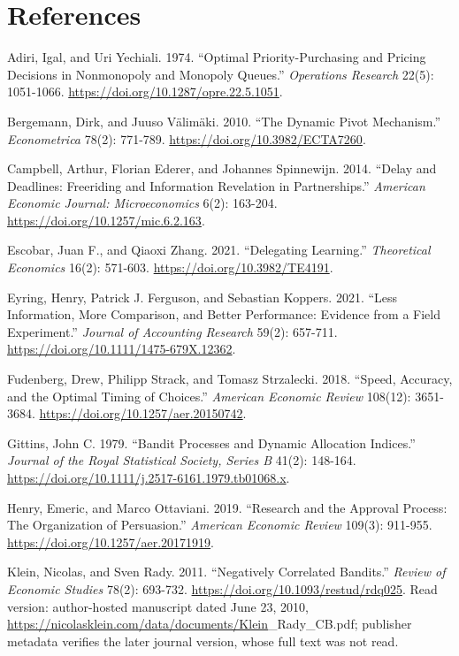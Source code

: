 \documentclass[
  11pt,
]{article}
\begin{document}
{
\small
\setlength{\parindent}{0pt}
\section*{References}\label{references}

Adiri, Igal, and Uri Yechiali. 1974. ``Optimal Priority-Purchasing and
Pricing Decisions in Nonmonopoly and Monopoly Queues.'' \emph{Operations
Research} 22(5): 1051-1066. \url{https://doi.org/10.1287/opre.22.5.1051}.

Bergemann, Dirk, and Juuso Välimäki. 2010. ``The Dynamic Pivot
Mechanism.'' \emph{Econometrica} 78(2): 771-789.
\url{https://doi.org/10.3982/ECTA7260}.

Campbell, Arthur, Florian Ederer, and Johannes Spinnewijn. 2014. ``Delay
and Deadlines: Freeriding and Information Revelation in Partnerships.''
\emph{American Economic Journal: Microeconomics} 6(2): 163-204.
\url{https://doi.org/10.1257/mic.6.2.163}.

Escobar, Juan F., and Qiaoxi Zhang. 2021. ``Delegating Learning.''
\emph{Theoretical Economics} 16(2): 571-603.
\url{https://doi.org/10.3982/TE4191}.

Eyring, Henry, Patrick J. Ferguson, and Sebastian Koppers. 2021. ``Less
Information, More Comparison, and Better Performance: Evidence from a
Field Experiment.'' \emph{Journal of Accounting Research} 59(2):
657-711. \url{https://doi.org/10.1111/1475-679X.12362}.

Fudenberg, Drew, Philipp Strack, and Tomasz Strzalecki. 2018. ``Speed,
Accuracy, and the Optimal Timing of Choices.'' \emph{American Economic
Review} 108(12): 3651-3684. \url{https://doi.org/10.1257/aer.20150742}.

Gittins, John C. 1979. ``Bandit Processes and Dynamic Allocation
Indices.'' \emph{Journal of the Royal Statistical Society, Series B}
41(2): 148-164. \url{https://doi.org/10.1111/j.2517-6161.1979.tb01068.x}.

Henry, Emeric, and Marco Ottaviani. 2019. ``Research and the Approval
Process: The Organization of Persuasion.'' \emph{American Economic
Review} 109(3): 911-955. \url{https://doi.org/10.1257/aer.20171919}.

Klein, Nicolas, and Sven Rady. 2011. ``Negatively Correlated Bandits.''
\emph{Review of Economic Studies} 78(2): 693-732.
\url{https://doi.org/10.1093/restud/rdq025}. Read version: author-hosted
manuscript dated June 23, 2010,
\url{https://nicolasklein.com/data/documents/Klein}\_Rady\_CB.pdf; publisher
metadata verifies the later journal version, whose full text was not
read.

}
\end{document}
